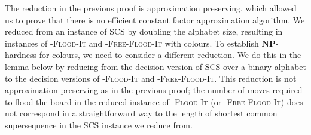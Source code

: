 \documentclass[a4paper,11pt]{llncs}
\newcounter{l}
\newcommand{\NPtime}{\ensuremath{\mathbf{NP}}}
\newcommand{\Coloroid}[1]{-\textsc{Flood-It}}
\newcommand{\ColoroidFree}[1]{-\textsc{Free-Flood-It}}
\newcommand{\SCS}{\textsc{SCS}}
\begin{document}
The reduction in the previous proof is approximation preserving, which allowed us to prove that there is no efficient constant factor approximation algorithm. We reduced from an instance of \SCS{} by doubling the alphabet size, resulting in instances of \Coloroid{c} and \ColoroidFree{c} with  colours. To establish \NPtime-hardness for  colours, we need to consider a different reduction. We do this in the lemma below by reducing from the decision version of \SCS{} over a binary alphabet to the decision versions of \Coloroid{3} and \ColoroidFree{3}. This reduction is not approximation preserving as in the previous proof; the number of moves required to flood the board in the reduced instance of \Coloroid{3} (or \ColoroidFree{3}) does not correspond in a straightforward way to the length of shortest common supersequence in the \SCS{} instance we reduce from.
\end{document}
